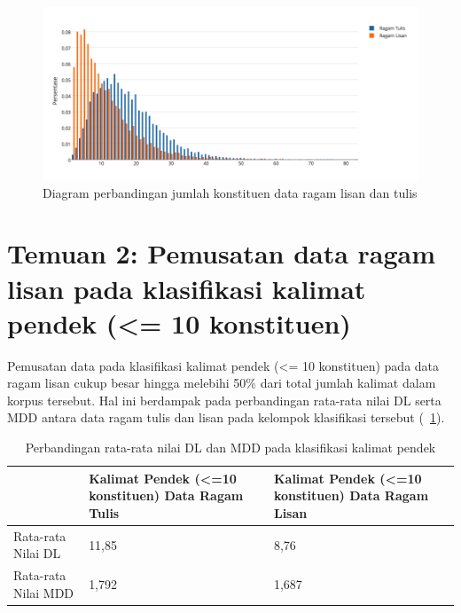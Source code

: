 \begin{figure}
	\centering \includegraphics[width=1
	\textwidth] {pics/Jumlah_kata.png} 
	\caption{Diagram perbandingan jumlah konstituen data ragam lisan dan tulis} 
	\label{fig:jumlah_kata} 
\end{figure}

\section{Temuan 2: Pemusatan data ragam lisan pada klasifikasi kalimat pendek (\textless= 10 konstituen)}
Pemusatan data pada klasifikasi kalimat pendek (\textless= 10 konstituen) pada data ragam lisan cukup besar hingga melebihi 50\% dari total jumlah kalimat dalam korpus tersebut. Hal ini berdampak pada perbandingan rata-rata nilai DL serta MDD antara data ragam tulis dan lisan pada kelompok klasifikasi tersebut (\tab~\ref{tab:DL_MDD_pendek}).

\begin{table}
\begin{center}
\caption{Perbandingan rata-rata nilai DL dan MDD pada klasifikasi kalimat pendek }\label{tab:DL_MDD_pendek}
  \begin{tabular}{ |p{4cm} | p{4cm} | p{4cm} |}
    \hline
 & Kalimat Pendek \newline (\textless =10 konstituen) \newline Data Ragam Tulis & Kalimat Pendek \newline (\textless =10 konstituen) \newline Data Ragam Lisan \\ \hline
 Rata-rata Nilai DL & 11,85 & 8,76 \\ \hline
 Rata-rata Nilai MDD & 1,792 & 1,687 \\ \hline
   \end{tabular}
\end{center}
\end{table}


